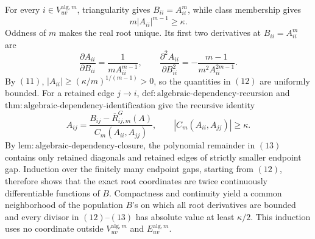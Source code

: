 For every \(i\in V_{uv}^{\mathrm{alg},m}\), triangularity gives \(B_{ii}=A_{ii}^m\), while class membership gives
\[
 m|A_{ii}|^{m-1}\ge\kappa.
\tag{11}
\]
Oddness of \(m\) makes the real root unique.  Its first two derivatives at \(B_{ii}=A_{ii}^m\) are
\[
 \frac{\partial A_{ii}}{\partial B_{ii}}
 =\frac{1}{mA_{ii}^{m-1}},
 \qquad
 \frac{\partial^2 A_{ii}}{\partial B_{ii}^2}
 =-\frac{m-1}{m^2A_{ii}^{2m-1}}.
\tag{12}
\]
By \((11)\), \(|A_{ii}|\ge(\kappa/m)^{1/(m-1)}>0\), so the quantities in \((12)\) are uniformly bounded.  For a retained edge \(j\to i\), \(\mathrm{def{:}algebraic\mbox{-}dependency\mbox{-}recursion}\) and \(\mathrm{thm{:}algebraic\mbox{-}dependency\mbox{-}identification}\) give the recursive identity
\[
 A_{ij}
 =\frac{B_{ij}-\overline R^{G}_{ij,m}(A)}
 {C_m(A_{ii},A_{jj})},
 \qquad
 |C_m(A_{ii},A_{jj})|\ge\kappa.
\tag{13}
\]
By \(\mathrm{lem{:}algebraic\mbox{-}dependency\mbox{-}closure}\), the polynomial remainder in \((13)\) contains only retained diagonals and retained edges of strictly smaller endpoint gap.  Induction over the finitely many endpoint gaps, starting from \((12)\), therefore shows that the exact root coordinates are twice continuously differentiable functions of \(B\).  Compactness and continuity yield a common neighborhood of the population \(B\)'s on which all root derivatives are bounded and every divisor in \((12)\)--\((13)\) has absolute value at least \(\kappa/2\).  This induction uses no coordinate outside \(V_{uv}^{\mathrm{alg},m}\) and \(E_{uv}^{\mathrm{alg},m}\).

